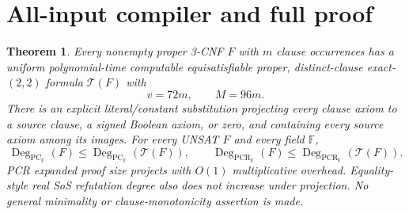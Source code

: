 \documentclass[11pt]{article}
\newtheorem{theorem}{Theorem}
\newcommand{\Deg}{\operatorname{Deg}}
\begin{document}
\section{All-input compiler and full proof}
\begin{theorem}
Every nonempty proper 3-CNF $F$ with $m$ clause occurrences has a uniform polynomial-time computable equisatisfiable proper, distinct-clause exact-$(2,2)$ formula $\mathcal T(F)$ with
\[
 v=72m,\qquad M=96m.
\]
There is an explicit literal/constant substitution projecting every clause axiom to a source clause, a signed Boolean axiom, or zero, and containing every source axiom among its images. For every UNSAT $F$ and every field $\mathbb F$,
\[
 \Deg_{\mathrm{PC}_{\mathbb F}}(F)\le\Deg_{\mathrm{PC}_{\mathbb F}}(\mathcal T(F)),\qquad
 \Deg_{\mathrm{PCR}_{\mathbb F}}(F)\le\Deg_{\mathrm{PCR}_{\mathbb F}}(\mathcal T(F)).
\]
PCR expanded proof size projects with $O(1)$ multiplicative overhead. Equality-style real SoS refutation degree also does not increase under projection. No general minimality or clause-monotonicity assertion is made.
\end{theorem}
\end{document}
